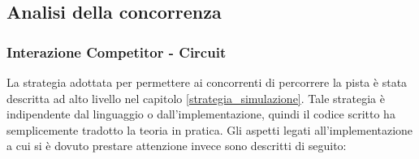 \subsection{Analisi della concorrenza}
\subsubsection{Interazione Competitor - Circuit}
La strategia adottata per permettere ai concorrenti di percorrere la pista \`{e} stata descritta ad alto livello nel capitolo \ref{strategia_simulazione}.
Tale strategia \`{e} indipendente dal linguaggio o dall'implementazione, quindi il codice scritto ha semplicemente tradotto la teoria in pratica.
Gli aspetti legati all'implementazione a cui si \`{e} dovuto prestare attenzione invece sono descritti di seguito:
